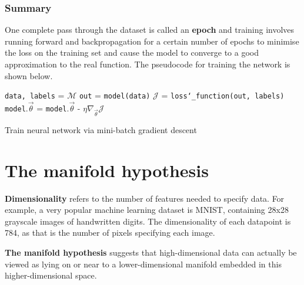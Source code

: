 \subsubsection{Summary}

One complete pass through the dataset 
is called an \textbf{epoch} and 
training involves running forward and backpropagation for a certain number of epochs to minimise the loss
on the training set and cause the model to converge to a good approximation to the real function. The pseudocode for training the network 
is shown below.
\begin{algorithm}
  \begin{algorithmic}[1]
    \State \texttt{data, labels} = $\mathcal{M}$
    \State \texttt{out} = \texttt{model(data)}
    \State $\mathcal{J}$ = \texttt{loss\char`_function(out, labels)}
    \State \texttt{model}.$\vec{\theta}$ = \texttt{model}.$\vec{\theta}$ - $\eta \nabla_{\vec{\theta}} \mathcal{J}$ 
    \EndFor
    \EndFor
    \EndProcedure
  \end{algorithmic}
  \caption{Train neural network via mini-batch gradient descent} 
  \label{alg:train}
\end{algorithm}

\section{The manifold hypothesis}

\textbf{Dimensionality} refers to the number of features needed to specify data. For example, a very popular machine learning dataset
is MNIST, containing 28x28 grayscale images of handwritten digits. The dimensionality of each datapoint is 784, as that is the
number of pixels specifying each image.

\textbf{The manifold hypothesis} suggests that high-dimensional data can actually be viewed as lying on or near to a
lower-dimensional manifold embedded in this higher-dimensional space.

